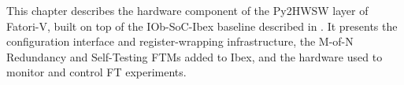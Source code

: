 This chapter describes the hardware component of the Py2HWSW layer of \ac{Fatori-V}, built on top of the IOb-\ac{SoC}-Ibex baseline described in . It presents the configuration interface and register-wrapping infrastructure, the M-of-N Redundancy and Self-Testing \acp{FTM} added to Ibex, and the hardware used to monitor and control \ac{FT} experiments.